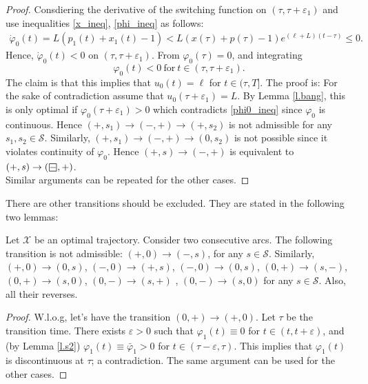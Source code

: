 \begin{proof}
	Consdiering the derivative of the switching function on $(\tau,\tau+\varepsilon_1)$ and use inequalities \eqref{x_ineq}, \eqref{phi_ineq} as follows:
	\begin{align}
		\dot\varphi_0(t) = L ( p_1(t) + x_1(t) - 1 )  < L ( x(\tau)+p(\tau) -1  ) e^{(\ell+L)(t-\tau)}  \le 0.
	\end{align}
	Hence, $\dot\varphi_0(t)<0$ on $(\tau,\tau+\varepsilon_1)$. 
	From $\varphi_0(\tau)=0$, and integrating 
	\begin{equation}
		\label{phi0_ineq} \varphi_0(t)<0  \ \mbox{for} \  t \in (\tau,\tau+\varepsilon_1). 
	\end{equation} 
	The claim is that this implies that $u_0(t)=\ell$ for $t \in (\tau, T]$.  
	The proof is: For the sake of contradiction assume that $u_0(\tau+\varepsilon_1)=L$. 
	By Lemma \ref{l.bang}, this is only optimal if $\varphi_0(\tau+\varepsilon_1)>0$ which  contradicts \eqref{phi0_ineq} since $\varphi_0$ is continuous. 
	Hence $(+,s_1) \to (-,+) \to (+,s_2)$ is not admissible for any $s_1,s_2 \in \mathscr S$. 
	Similarly,  $(+,s_1) \to (-,+) \to (0,s_2)$ is not possible since it violates continuity of  $\varphi_0$.  
	Hence $(+,s) \to (-,+)$ is equivalent to $(+,s) \to (\sq{-},+)$.\\ 
	Similar arguments can be repeated for the other cases.
\end{proof}

There are other transitions should be excluded. They are stated in the following two lemmas:
%
\begin{lemma}
	Let $\mathscr X$ be an optimal trajectory. 
	Consider two consecutive arcs.
	 The following transition is not admissible: $(+,0) \to (-,s)$,  for any $s \in \mathscr S$. Similarly, $(+,0) \to (0,s)$, $(-,0) \to (+,s)$, $(-,0) \to (0,s)$,  $(0,+) \to (s,-)$, $(0,+) \to (s,0)$,  $(0,-) \to (s,+)$ ,   $(0,-) \to (s,0)$ for any $s \in \mathscr S$. 
	 Also, all their reverses.
\end{lemma}
%
\begin{proof}   
	W.l.o.g, let's have the transition $(0,+) \to (+,0)$. 
	Let $\tau$ be the transition time. 
	There exists $\varepsilon >0$ such that $\varphi_1(t)\equiv 0 $ for $t \in (t,t+\varepsilon)$, and (by Lemma \ref{l.s2})  $\varphi_1(t) \equiv \bar\varphi_1 >0$ for $t \in (\tau-\varepsilon, \tau)$. 
	This implies that $\varphi_1(t)$ is discontinuous at $\tau$; a contradiction. 
	The same argument can be used for the other cases.
\end{proof}

